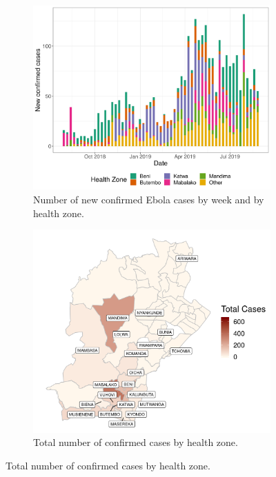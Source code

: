 \documentclass[12pt]{article}
\begin{document}
\begin{figure}[h!]
\begin{subfigure}{0.48\textwidth}
  \centering

  \includegraphics[width=\textwidth]{../output/epi_curve.png}
  \caption{Number of new confirmed Ebola cases by week and by health zone.}
  \label{fig:epi_curve}
\end{subfigure}
\begin{subfigure}{0.48\textwidth}
  \centering
  \includegraphics[width=\textwidth]{../output/tot_map.png}
  \caption{Total number of confirmed cases by health zone.}
  \label{fig:tot_map}
\end{subfigure}


\end{figure}
\end{document}
